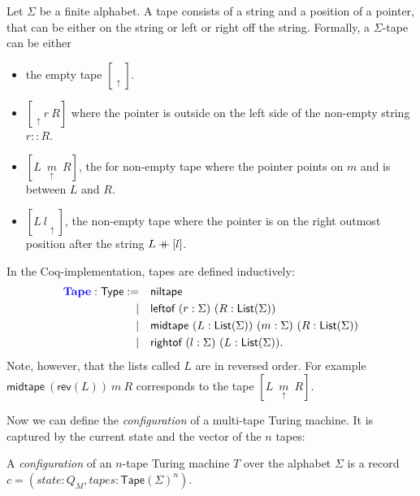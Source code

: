 \documentclass{psartcl}
\newcommand{\MS}[1]{\textsf{#1}}
\newcommand{\cons}{\mathbin{::}}
\newcommand{\rev}{\MS{rev}}
\newcommand\mdoubleplus{\ensuremath{\mathbin{+\mkern-10mu+}}}
\newcommand{\app}{\mdoubleplus}
\newcommand{\Type}{\MS{Type}}
\newcommand{\List}{\MS{List}}
\newcommand{\tape}[1]{[ #1 ]}
\newcommand{\tapePointer}[1]{\; \underset{\uparrow}{#1} \;}
\newcommand{\niltape}{\tape{\tapePointer{}}}
\newcommand{\midtape}[3]{\tape{#1 ~ \tapePointer{#2} ~ #3}}
\newcommand{\leftof}[2]{\tape{\tapePointer{} #1 ~ #2}}
\newcommand{\rightof}[2]{\tape{#1 ~ #2 \tapePointer{}}}
\newcommand{\Tape}{\MS{Tape}}
\begin{document}
\begin{definition}[Tape]
  \label{def:tape}
  Let $\Sigma$ be a finite alphabet.  A tape consists of a string and a position of a pointer, that can be either on the string or left or right off
  the string.  Formally, a $\Sigma$-tape can be either
  \begin{itemize}
    \item the empty tape $\niltape$.
    \item $\leftof{r}{R}$ where the pointer is outside on the left side of the non-empty string $r \cons R$.
    \item $\midtape{L}{m}{R}$, the for non-empty tape where the pointer points on $m$ and is between $L$ and $R$.
    \item $\rightof{L}{l}$, the non-empty tape where the pointer is on the right outmost position after the string $L \app [l]$.
  \end{itemize}


  In the Coq-implementation, tapes are defined inductively:
  \begin{alignat*}{2}
    \emph{Tape}:\Type := \quad & \MS{niltape} \\
                         | \quad & \MS{leftof}  ~ (r:\Sigma) ~ (R:\List(\Sigma)) \\
                         | \quad & \MS{midtape} ~ (L:\List(\Sigma)) ~ (m:\Sigma) ~ (R:\List(\Sigma)) \\
                         | \quad & \MS{rightof} ~ (l:\Sigma) ~ (L:\List(\Sigma)).
  \end{alignat*}
  Note, however, that the lists called $L$ are in reversed order.  For example $\MS{midtape}~(\rev(L))~m~R$ corresponds to the tape
  $\midtape{L}{m}{R}$.
\end{definition}

Now we can define the \emph{configuration} of a multi-tape Turing machine.  It is captured by the current state and the vector of the $n$ tapes:
\begin{definition}[Configuration]
  \label{def:config}
  A \emph{configuration} of an $n$-tape Turing machine $T$ over the alphabet $\Sigma$ is a record $c=(state:Q_M, tapes:\Tape(\Sigma)^n)$.
\end{definition}
\end{document}
